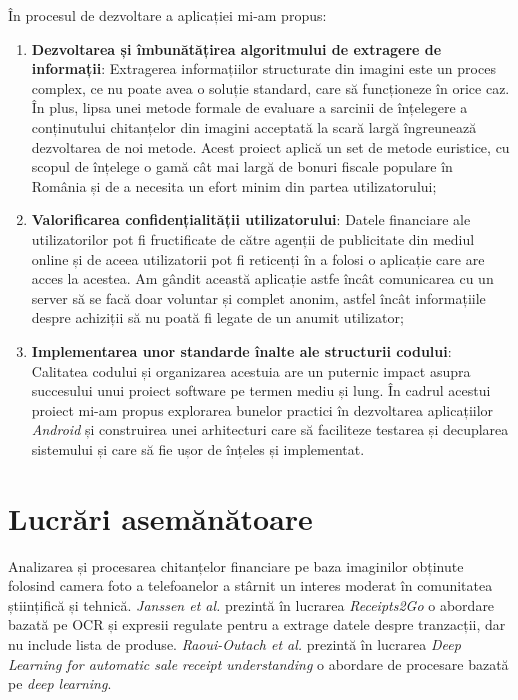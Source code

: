În procesul de dezvoltare a aplicației \AppName{} mi-am propus:
\begin{enumerate}
  \item 
  \textbf{Dezvoltarea și îmbunătățirea algoritmului de extragere de informații}: Extragerea informațiilor structurate din imagini este un proces complex, ce nu poate avea o soluție standard, care să funcționeze în orice caz. În plus, lipsa unei metode formale de evaluare a sarcinii de înțelegere a conținutului chitanțelor din imagini acceptată la scară largă îngreunează dezvoltarea de noi metode. Acest proiect aplică un set de metode euristice, cu scopul de înțelege o gamă cât mai largă de bonuri fiscale populare în România și de a necesita un efort minim din partea utilizatorului;
  \item
  \textbf{Valorificarea confidențialității utilizatorului}: Datele financiare ale utilizatorilor pot fi fructificate de către agenții de publicitate din mediul online și de aceea utilizatorii pot fi reticenți în a folosi o aplicație care are acces la acestea. Am gândit această aplicație astfe încât comunicarea cu un server să se facă doar voluntar și complet anonim, astfel încât informațiile despre achiziții să nu poată fi legate de un anumit utilizator;
  \item
  \textbf{Implementarea unor standarde înalte ale structurii codului}: Calitatea codului și organizarea acestuia are un puternic impact asupra succesului unui proiect software pe termen mediu și lung. În cadrul acestui proiect mi-am propus explorarea bunelor practici în dezvoltarea aplicațiilor \emph{Android} și construirea unei arhitecturi care să faciliteze testarea și decuplarea sistemului și care să fie ușor de înțeles și implementat.
\end{enumerate}

\section{Lucrări asemănătoare}\label{related_intro}

Analizarea și procesarea chitanțelor financiare pe baza imaginilor obținute folosind camera foto a telefoanelor a stârnit un interes moderat în comunitatea științifică și tehnică. \emph{Janssen et al.} prezintă în lucrarea \emph{Receipts2Go} \cite{Receipts2Go} o abordare bazată pe OCR și expresii regulate pentru a extrage datele despre tranzacții, dar nu include lista de produse. \emph{Raoui-Outach et al.} prezintă în lucrarea \emph{Deep Learning for automatic sale receipt understanding} \cite{DL_receipt_understanding} o abordare de procesare bazată pe \emph{deep learning}.

